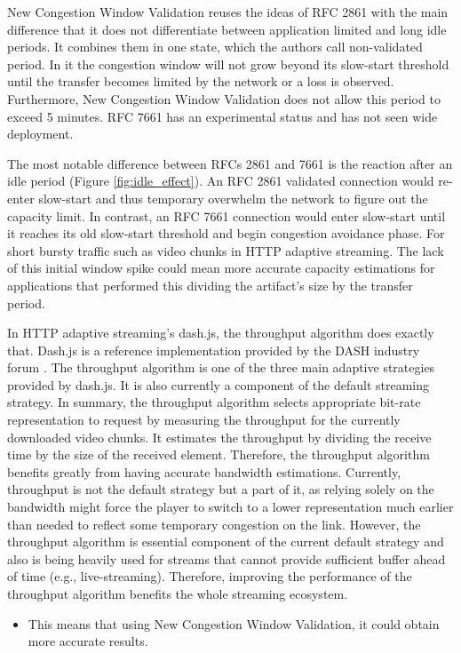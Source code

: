 \documentclass[10pt,sigconf]{acmart}
\begin{document}
New Congestion Window Validation reuses the ideas of RFC 2861 with the main difference that it does not differentiate between application limited and long idle periods. It combines them in one state, which the authors call non-validated period. In it the congestion window will not grow beyond its slow-start threshold until the transfer becomes limited by the network or a loss is observed. Furthermore, New Congestion Window Validation does not allow this period to exceed 5 minutes. RFC 7661 has an experimental status and has not seen wide deployment.

The most notable difference between RFCs 2861 and 7661 is the reaction after an idle period (Figure \ref{fig:idle_effect}). An RFC 2861 validated connection would re-enter slow-start and thus temporary overwhelm the network to figure out the capacity limit. In contrast, an RFC 7661 connection would enter slow-start until it reaches its old slow-start threshold and begin congestion avoidance phase. For short bursty traffic such as video chunks in HTTP adaptive streaming. The lack of this initial window spike could mean more accurate capacity estimations for applications that performed this dividing the artifact's size by the transfer period.

In HTTP adaptive streaming's dash.js, the throughput algorithm does exactly that. Dash.js is a reference implementation provided by the DASH industry forum \cite{online-dashif}. The throughput algorithm is one of the three main adaptive strategies provided by dash.js. It is also currently a component of the default streaming strategy. In summary, the throughput algorithm selects appropriate bit-rate representation to request by measuring the throughput for the currently downloaded video chunks. It estimates the throughput by dividing the receive time by the size of the received element. Therefore, the throughput algorithm benefits greatly from having accurate bandwidth estimations. Currently, throughput is not the default strategy but a part of it, as relying solely on the bandwidth might force the player to switch to a lower representation much earlier than needed to reflect some temporary congestion on the link. However, the throughput algorithm is essential component of the current default strategy and also is being heavily used for streams that cannot provide sufficient buffer ahead of time (e.g., live-streaming). Therefore, improving the performance of the throughput algorithm benefits the whole streaming ecosystem.

\begin{itemize}
    \item This means that using New Congestion Window Validation, it could obtain more accurate results.
\end{itemize}
\end{document}
